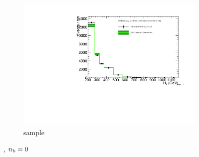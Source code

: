 \begin{figure}[h!]
\begin{subfigure}[b]{0.48\textwidth}
    \includegraphics[width=\textwidth,page=6]
    {Figs/results/v0/greenBand/bestFit_2012dev_RQcdZero_fZinvAll_0b_le3j-12p_smOnly}
    \caption{\gj sample}
  \end{subfigure}
  \caption{\njlow, $n_{\text{b}} = 0$}
  \label{fig:green_fits_0b_le3j}
\end{figure}

